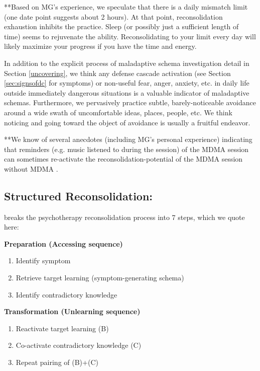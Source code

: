 \documentclass[12pt,letterpaper]{book}
\begin{document}
**Based on MG's experience, we speculate that there is a daily mismatch limit (one date point suggests about 2 hours). At that point, reconsolidation exhaustion inhibits the practice. Sleep (or possibly just a sufficient length of time) seems to rejuvenate the ability. Reconsolidating to your limit every day will likely maximize your progress if you have the time and energy.



In addition to the explicit process of maladaptive schema investigation detail in Section \ref{uncovering}, we think any defense cascade activation (see Section \ref{sec:signsofdc} for symptoms) or non-useful fear, anger, anxiety, etc. in daily life outside immediately dangerous situations is a valuable indicator of maladaptive schemas. Furthermore, we pervasively practice subtle, barely-noticeable avoidance around a wide swath of uncomfortable ideas, places, people, etc. We think noticing and going toward the object of avoidance is usually a fruitful endeavor.

**We know of several anecdotes (including MG's personal experience) indicating that reminders (e.g. music listened to during the session) of the MDMA session can sometimes re-activate the reconsolidation-potential of the MDMA session without MDMA \cite{simmering}.

\subsection*{Structured Reconsolidation:}
\textcite{eckerUnlocking} breaks the psychotherapy reconsolidation process into 7 steps, which we quote here:

\noindent\textbf{Preparation (Accessing sequence)}
\begin{enumerate}
\renewcommand{\labelenumi}{\Alph{enumi}.}
    \item Identify symptom
    \item Retrieve target learning (symptom-generating schema)
    \item Identify contradictory knowledge
\end{enumerate}

\noindent\textbf{Transformation (Unlearning sequence)}
\begin{enumerate}
    \item Reactivate target learning (B)
    \item Co-activate contradictory knowledge (C)
    \item Repeat pairing of (B)+(C)
\end{enumerate}
\end{document}
